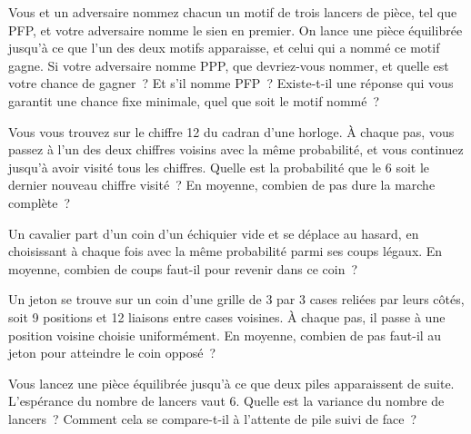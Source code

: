\begin{question}\label{iq:iv1:waiting-times-and-markov-chains:15}
Vous et un adversaire nommez chacun un motif de trois lancers de pièce, tel que PFP, et votre adversaire nomme le sien en premier. On lance une pièce équilibrée jusqu'à ce que l'un des deux motifs apparaisse, et celui qui a nommé ce motif gagne. Si votre adversaire nomme PPP, que devriez-vous nommer, et quelle est votre chance de gagner~? Et s'il nomme PFP~? Existe-t-il une réponse qui vous garantit une chance fixe minimale, quel que soit le motif nommé~?
\end{question}

\begin{question}\label{iq:iv1:waiting-times-and-markov-chains:16}
Vous vous trouvez sur le chiffre 12 du cadran d'une horloge. À chaque pas, vous passez à l'un des deux chiffres voisins avec la même probabilité, et vous continuez jusqu'à avoir visité tous les chiffres. Quelle est la probabilité que le 6 soit le dernier nouveau chiffre visité~? En moyenne, combien de pas dure la marche complète~?
\end{question}

\begin{question}\label{iq:iv1:waiting-times-and-markov-chains:17}
Un cavalier part d'un coin d'un échiquier vide et se déplace au hasard, en choisissant à chaque fois avec la même probabilité parmi ses coups légaux. En moyenne, combien de coups faut-il pour revenir dans ce coin~?
\end{question}

\begin{question}\label{iq:iv1:waiting-times-and-markov-chains:18}
Un jeton se trouve sur un coin d'une grille de 3 par 3 cases reliées par leurs côtés, soit 9 positions et 12 liaisons entre cases voisines. À chaque pas, il passe à une position voisine choisie uniformément. En moyenne, combien de pas faut-il au jeton pour atteindre le coin opposé~?
\end{question}

\begin{question}\label{iq:iv1:waiting-times-and-markov-chains:19}
Vous lancez une pièce équilibrée jusqu'à ce que deux piles apparaissent de suite. L'espérance du nombre de lancers vaut 6. Quelle est la variance du nombre de lancers~? Comment cela se compare-t-il à l'attente de pile suivi de face~?
\end{question}

